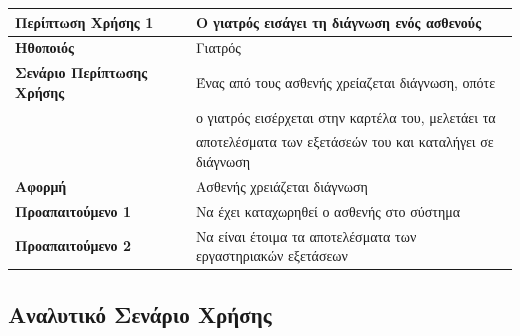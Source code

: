 \documentclass{article}
\newcommand\T{\rule{0pt}{2.6ex}}       %
\newcommand\B{\rule[-1.2ex]{0pt}{0pt}}
\begin{document}
\begin{center}
     \begin{tabular}{|l|l|}
     \hline
      \textbf{Περίπτωση Χρήσης 1} & Ο γιατρός εισάγει τη διάγνωση ενός ασθενούς \T\B \\ 
      \hline
      \textbf{Ηθοποιός} & Γιατρός \T\B \\
      \hline
      \textbf{Σενάριο Περίπτωσης Χρήσης} & Ένας από τους ασθενής χρείαζεται διάγνωση, οπότε \T\\& ο γιατρός εισέρχεται στην καρτέλα του, μελετάει τα\\& αποτελέσματα των εξετάσεών του και καταλήγει σε διάγνωση \B \\
      \hline
      \textbf{Αφορμή} & Ασθενής χρειάζεται διάγνωση \T\B \\
      \hline
      \textbf{Προαπαιτούμενο 1} & Να έχει καταχωρηθεί ο ασθενής στο σύστημα \T\B \\
      \hline
      \textbf{Προαπαιτούμενο 2} & Να είναι έτοιμα τα αποτελέσματα των εργαστηριακών εξετάσεων \T\B \\
      \hline
     \end{tabular}
 \end{center}
 
 \subsection{Αναλυτικό Σενάριο Χρήσης}
 
\end{document}
